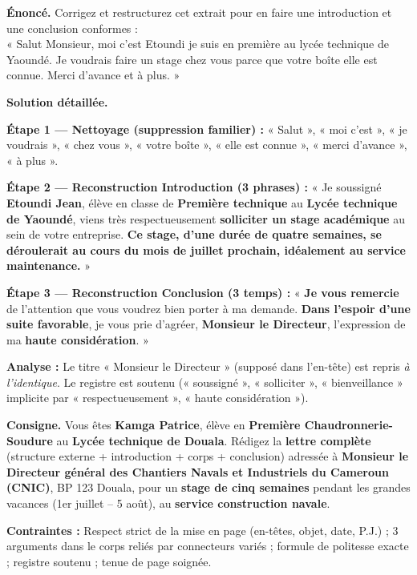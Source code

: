 \documentclass[11pt]{article}
\begin{document}
\begin{exoresolu}
\textbf{Énoncé.} Corrigez et restructurez cet extrait pour en faire une introduction et une conclusion conformes : \\
« Salut Monsieur, moi c'est Etoundi je suis en première au lycée technique de Yaoundé. Je voudrais faire un stage chez vous parce que votre boîte elle est connue. Merci d'avance et à plus. »

\tcblower
\textbf{Solution détaillée.}

\textbf{Étape 1 — Nettoyage (suppression familier) :} « Salut », « moi c'est », « je voudrais », « chez vous », « votre boîte », « elle est connue », « merci d'avance », « à plus ».

\textbf{Étape 2 — Reconstruction Introduction (3 phrases) :}
« Je soussigné \textbf{Etoundi Jean}, élève en classe de \textbf{Première technique} au \textbf{Lycée technique de Yaoundé}, viens très respectueusement \textbf{solliciter un stage académique} au sein de votre entreprise. \textbf{Ce stage, d'une durée de quatre semaines, se déroulerait au cours du mois de juillet prochain, idéalement au service maintenance.} »

\textbf{Étape 3 — Reconstruction Conclusion (3 temps) :}
« \textbf{Je vous remercie} de l'attention que vous voudrez bien porter à ma demande. \textbf{Dans l'espoir d'une suite favorable}, je vous prie d'agréer, \textbf{Monsieur le Directeur}, l'expression de ma \textbf{haute considération}. »

\textbf{Analyse :} Le titre « Monsieur le Directeur » (supposé dans l'en-tête) est repris \textit{à l'identique}. Le registre est soutenu (« soussigné », « solliciter », « bienveillance » implicite par « respectueusement », « haute considération »).
\end{exoresolu}

\begin{exercice}
\textbf{Consigne.} Vous êtes \textbf{Kamga Patrice}, élève en \textbf{Première Chaudronnerie-Soudure} au \textbf{Lycée technique de Douala}. Rédigez la \textbf{lettre complète} (structure externe + introduction + corps + conclusion) adressée à \textbf{Monsieur le Directeur général des Chantiers Navals et Industriels du Cameroun (CNIC)}, BP 123 Douala, pour un \textbf{stage de cinq semaines} pendant les grandes vacances (1er juillet – 5 août), au \textbf{service construction navale}.

\textbf{Contraintes :} Respect strict de la mise en page (en-têtes, objet, date, P.J.) ; 3 arguments dans le corps reliés par connecteurs variés ; formule de politesse exacte ; registre soutenu ; tenue de page soignée.
\end{exercice}
\end{document}
